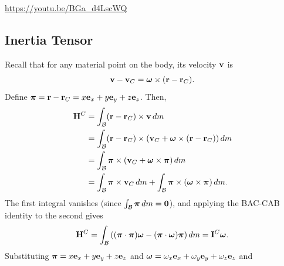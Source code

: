 \documentclass[
  letterpaper,
  DIV=11,
  numbers=noendperiod]{scrreprt}
\newcommand{\lp}{\left(}
\newcommand{\rp}{\right)}
\newcommand{\bomega}{\boldsymbol{\omega}}
\newcommand{\bpi}{\boldsymbol{\pi}}
\begin{document}
\url{https://youtu.be/BGa_d4LscWQ}

\subsection{Inertia Tensor}\label{inertia-tensor}

Recall that for any material point on the body, its velocity \({\bf v}\)
is \begin{align}
    {\bf v}-{\bf v}_C = \bomega\times({\bf r}-{\bf r}_C).
\end{align} Define
\(\bpi = {\bf r}-{\bf r}_C = x{\bf e}_x+y{\bf e}_y+z{\bf e}_z\). Then,
\begin{align}
    {\bf H}^C &= \int_{\mathcal{B}}({\bf r}-{\bf r}_C)\times{\bf v}\,dm\\
    &= \int_{\mathcal{B}}({\bf r}-{\bf r}_C)\times({\bf v}_C+\bomega\times({\bf r}-{\bf r}_C))\,dm\\
    &= \int_{\mathcal{B}}\bpi\times({\bf v}_C+\bomega\times\bpi)\,dm\\
    &= \int_{\mathcal{B}}\bpi\times{\bf v}_C\,dm+\int_{\mathcal{B}}\bpi\times(\bomega\times\bpi)\,dm.
\end{align} The first integral vanishes (since
\(\int_{\mathcal{B}}\bpi\,dm={\bf 0}\)), and applying the BAC-CAB
identity to the second gives \begin{align}
    {\bf H}^C = \int_{\mathcal{B}}\lp(\bpi\cdot\bpi)\bomega-(\bpi\cdot\bomega)\bpi\rp dm = {\bf I}^C\bomega.
\end{align} Substituting \(\bpi = x{\bf e}_x+y{\bf e}_y+z{\bf e}_z\) and
\(\bomega=\omega_x{\bf e}_x+\omega_y{\bf e}_y+\omega_z{\bf e}_z\) and
\end{document}
